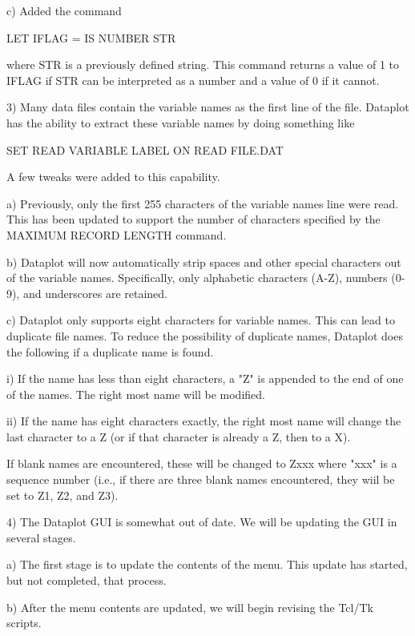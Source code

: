      c) Added the command

           LET IFLAG = IS NUMBER STR

        where STR is a previously defined string.  This command
        returns a value of 1 to IFLAG if STR can be interpreted as a
        number and a value of 0 if it cannot.

 3) Many data files contain the variable names as the first line of the
    file.  Dataplot has the ability to extract these variable names by
    doing something like

        SET READ VARIABLE LABEL ON
        READ FILE.DAT

    A few tweaks were added to this capability.

    a) Previously, only the first 255 characters of the variable names
       line were read.  This has been updated to support the number
       of characters specified by the MAXIMUM RECORD LENGTH command.

    b) Dataplot will now automatically strip spaces and other special
       characters out of the variable names.  Specifically, only
       alphabetic characters (A-Z), numbers (0-9), and underscores are
       retained.

    c) Dataplot only supports eight characters for variable names.  This
       can lead to duplicate file names.  To reduce the possibility of
       duplicate names, Dataplot does the following if a duplicate name
       is found.

          i) If the name has less than eight characters, a "Z" is appended
             to the end of one of the names.  The right most name will
             be modified.

         ii) If the name has eight characters exactly, the right most
             name will change the last character to a Z (or if that
             character is already a Z, then to a X).

       If blank names are encountered, these will be changed to
       Zxxx where "xxx" is a sequence number (i.e., if there are three
       blank names encountered, they wiil be set to Z1, Z2, and Z3).

  4) The Dataplot GUI is somewhat out of date.  We will be updating the
     GUI in several stages.

     a) The first stage is to update the contents of the menu.  This
        update has started, but not completed, that process.

     b) After the menu contents are updated, we will begin revising
        the Tcl/Tk scripts.

